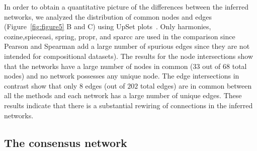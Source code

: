   In order to obtain a quantitative picture of the differences between the inferred networks, we analyzed the distribution of common nodes and edges (Figure~\ref{fig:figure5} B and C) using UpSet plots~\cite{Lex}.
  Only \ac{harmonies}, \ac{cozine},\ac{spieceasi}, \ac{spring}, propr, and \ac{sparcc} are used in the comparison since Pearson and Spearman add a large number of spurious edges since they are not intended for compositional datasets).
  The results for the node intersections show that the networks have a large number of nodes in common ($33$ out of $68$ total nodes) and no network possesses any unique node.
  The edge intersections in contrast show that only $8$ edges (out of $202$ total edges) are in common between all the methods and each network has a large number of unique edges.
  These results indicate that there is a substantial rewiring of connections in the inferred networks.


  \FloatBarrier

  \subsection*{The consensus network}

